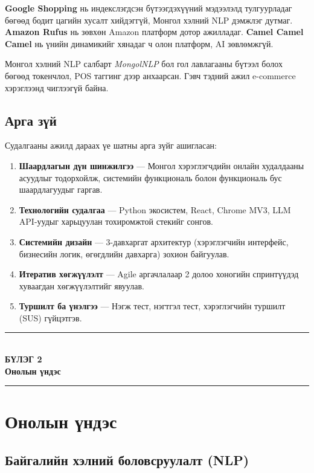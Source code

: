 \documentclass[12pt,a4paper]{report}
\newcommand{\chappage}[2]{%
  \clearpage
  \thispagestyle{empty}
  \null\vfill
  \begin{center}
    \rule{0.60\textwidth}{0.8pt}\\[18pt]
    {\fontsize{22}{28}\selectfont\bfseries БҮЛЭГ #1}\\[12pt]
    {\Large\bfseries #2}\\[18pt]
    \rule{0.60\textwidth}{0.8pt}
  \end{center}
  \vfill\null
  \clearpage}
\begin{document}
\textbf{Google Shopping} \cite{googleShopping} нь индекслэгдсэн бүтээгдэхүүний мэдээлэлд тулгуурладаг бөгөөд бодит цагийн хусалт хийдэггүй, Монгол хэлний NLP дэмжлэг дутмаг. \textbf{Amazon Rufus} \cite{amazonRufus} нь зөвхөн Amazon платформ дотор ажилладаг. \textbf{Camel Camel Camel} \cite{camelCamel} нь үнийн динамикийг хянадаг ч олон платформ, AI зөвлөмжгүй.

Монгол хэлний NLP салбарт \textit{MongolNLP} \cite{mongolNLP} бол гол лавлагааны бүтээл болох бөгөөд токенчлол, POS таггинг дээр анхаарсан. Гэвч тэдний ажил e-commerce хэрэглээнд чиглээгүй байна.

\section{Арга зүй}

Судалгааны ажилд дараах үе шатны арга зүйг ашигласан:

\begin{enumerate}[leftmargin=1.5cm]
  \item \textbf{Шаардлагын дүн шинжилгээ} --- Монгол хэрэглэгчдийн онлайн худалдааны асуудлыг тодорхойлж, системийн функциональ болон функциональ бус шаардлагуудыг гаргав.
  \item \textbf{Технологийн судалгаа} --- Python экосистем, React, Chrome MV3, LLM API-уудыг харьцуулан тохиромжтой стекийг сонгов.
  \item \textbf{Системийн дизайн} --- 3-давхаргат архитектур (хэрэглэгчийн интерфейс, бизнесийн логик, өгөгдлийн давхарга) зохион байгуулав.
  \item \textbf{Итератив хөгжүүлэлт} --- Agile аргачлалаар 2 долоо хоногийн спринтүүдэд хуваагдан хөгжүүлэлтийг явуулав.
  \item \textbf{Туршилт ба үнэлгээ} --- Нэгж тест, нэгтгэл тест, хэрэглэгчийн туршилт (SUS) гүйцэтгэв.
\end{enumerate}

\chappage{2}{Онолын үндэс}

\chapter{Онолын үндэс}

\section{Байгалийн хэлний боловсруулалт (NLP)}
\end{document}
